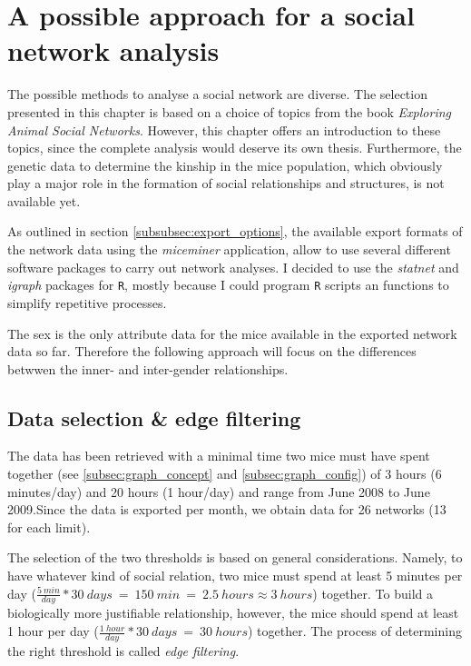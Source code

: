 \section{A possible approach for a social network analysis}
\label{sec:network_analysis}

The possible methods to analyse a social network are diverse. The selection presented in this chapter is based on a choice of topics from the book \textit{Exploring Animal Social Networks}\cite{croft:07}. However, this chapter offers an introduction to these topics, since the complete analysis would deserve its own thesis. Furthermore, the genetic data to determine the kinship in the mice population, which obviously play a major role in the formation of social relationships and structures, is not available yet.  

As outlined in section \ref{subsubsec:export_options}, the available export formats of the network data using the \textit{miceminer} application, allow to use several different software packages to carry out network analyses. I decided to use the \textit{statnet}\cite{statnet:03} and \textit{igraph}\cite{igraph:06} packages for \lstinline|R|\cite{r:05}, mostly because I could program \lstinline|R| scripts an functions to simplify repetitive processes.


The sex is the only attribute data for the mice available in the exported network data so far. Therefore the following approach will focus on the differences betwwen the inner- and inter-gender relationships.

\subsection{Data selection \& edge filtering}
\label{subsec:data_selection}

The data has been retrieved with a minimal time two mice must have spent together (see \ref{subsec:graph_concept} and \ref{subsec:graph_config}) of 3 hours (6 minutes/day) and 20 hours (1 hour/day) and range from June 2008 to June 2009.Since the data is exported per month, we obtain data for 26 networks (13 for each limit).

The selection of the two thresholds is based on general considerations. Namely, to have whatever kind of social relation, two mice must spend at least 5 minutes per day ($\frac{5\:min}{day} * 30\:days\:=\:150\:min\:=\:2.5\:hours \approx 3\:hours$) together. To build a biologically more justifiable relationship, however, the mice should spend at least 1 hour per day ($\frac{1\:hour}{day} * 30\:days\:=\:30\:hours$) together. The process of determining the right threshold is called \textit{edge filtering}. 


